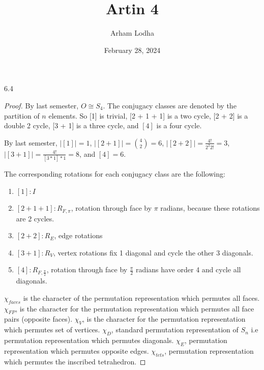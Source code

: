 \documentclass{article}
\begin{document}
\title{Artin 4}
\author{Arham Lodha}%
\date{February 28, 2024}%
\maketitle

\begin{PROB}{6.4}\label{Problem 6.4.}
\end{PROB}
\begin{proof}
    By last semester, $O \cong S_4$.  
    The conjugacy classes are denoted by the partition of $n$ elements. So [1] is trivial, [2 + 1 + 1] is a two cycle, [2 + 2]  is a double 2 cycle, [3 + 1] is a three cycle, and $[4]$ is a four cycle. 

    By last semester, $|[1]| = 1$, $|[2 + 1]| = {4 \choose 2} = 6$, $|[2 + 2]| = \frac{4!}{2^2 2!} = 3$, $|[3 + 1]| = \frac{4!}{[3 * 1] * 1} = 8$, and $[4] = 6$.
    
    The corresponding rotations for each conjugacy class are the following:
    \begin{enumerate}
        \item $[1] : I$
        \item $[2 + 1 + 1] : R_{F, \pi}$, rotation through face by $\pi$ radians, because these rotations are 2 cycles.
        \item $[2 + 2]: R_{E}$, edge rotations
        \item $[3 + 1]: R_{V}$, vertex rotations fix 1 diagonal and cycle the other 3 diagonals.
        \item $[4] : R_{F, \frac{\pi}{2}}$, rotation through face by $\frac{\pi}{2}$ radians have order 4 and cycle all diagonals.    
    \end{enumerate}

    $\chi_{faces}$ is the character of the permutation representation which permutes all faces. $\chi_{FP}$, is the character for the permutation representation which permutes all face pairs (opposite faces). $\chi_{V}$, is the character for the permutation representation which permutes set of vertices. $\chi_{D}$, standard permutation representation of $S_n$ i.e permutation representation which permutes diagonals. $\chi_{E}$, permutation representation which permutes opposite edges. $\chi_{tets}$, permutation representation which permutes the inscribed tetrahedron. 
    

\end{proof}
\end{document}
